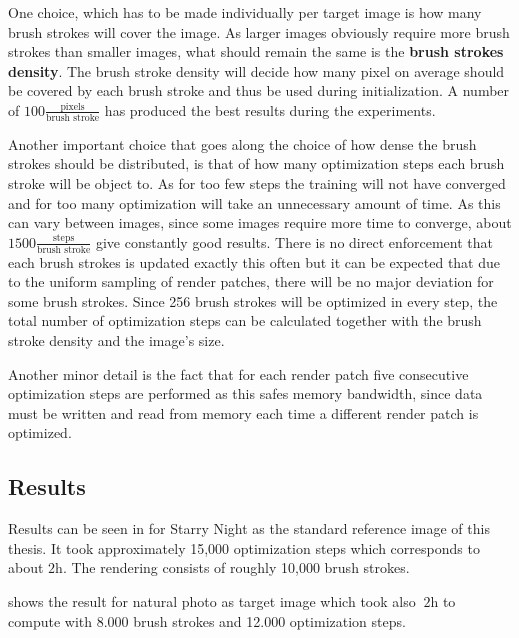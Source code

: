 One choice, which has to be made individually per target image is how many brush strokes
will cover the image.
As larger images obviously require more brush strokes than smaller images, what should
remain the same is the \textbf{brush strokes density}.
The brush stroke density will decide how many pixel on average should be covered by
each brush stroke and thus be used during initialization.
A number of $100 \frac{\text{pixels}}{\text{brush stroke}}$ has produced the best
results during the experiments.

Another important choice that goes along the choice of how dense the brush strokes
should be distributed, is that of how many optimization steps each brush stroke will
be object to.
As for too few steps the training will not have converged and for too many optimization
will take an unnecessary amount of time.
As this can vary between images, since some images require more time to converge,
about $1500 \frac{\text{steps}}{\text{brush stroke}}$ give constantly good results.
There is no direct enforcement that each brush strokes is updated exactly this often
but it can be expected that due to the uniform sampling of render patches, there
will be no major deviation for some brush strokes.
Since 256 brush strokes will be optimized in every step, the total number of
optimization steps can be calculated together with the brush stroke density and the
image's size.

Another minor detail is the fact that for each render patch five consecutive optimization
steps are performed as this safes memory bandwidth, since data must be written and read
from memory each time a different render patch is optimized.

\subsection{Results}

Results can be seen in  for Starry Night as the standard reference
image of this thesis.
It took approximately 15,000 optimization steps which corresponds to about $2\si{\hour}$.
The rendering consists of roughly 10,000 brush strokes.

 shows the result for natural photo as target image which took
also $~2\si{\hour}$ to compute with 8.000 brush strokes and 12.000 optimization steps.
